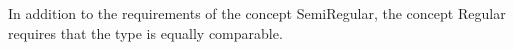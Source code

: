 In addition to the requirements of the concept SemiRegular, the concept Regular requires that the type is equally comparable.